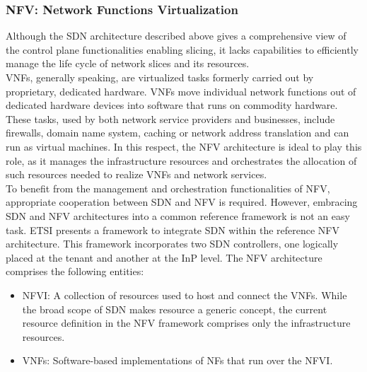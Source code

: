 \documentclass{report}
\begin{document}
\subsubsection{NFV: Network Functions Virtualization}
Although the SDN architecture described above
gives a comprehensive view of the control plane
functionalities enabling slicing, it lacks capabilities
to efficiently manage the life cycle of
network slices and its resources. \\
VNFs, generally speaking, are virtualized tasks formerly carried out by proprietary, dedicated hardware. VNFs move individual network functions out of dedicated hardware devices into software that runs on commodity hardware. These tasks, used by both network service providers and businesses, include firewalls, domain name system, caching or network address translation and can run as virtual machines. In this respect, the NFV architecture is ideal to play
this role, as it manages the infrastructure resources
and orchestrates the allocation of such resources
needed to realize VNFs and network services.\\
To benefit from the management and orchestration functionalities of NFV, appropriate cooperation between SDN and NFV is required.
However, embracing SDN and NFV architectures
into a common reference framework is not an
easy task. ETSI presents a framework
to integrate SDN within the reference NFV architecture. This framework incorporates two SDN
controllers, one logically placed at the tenant and
another at the InP level. The NFV architecture comprises the following
entities:\\
\begin{itemize}
\item \gls{NFVI}: A collection of resources used to
host and connect the VNFs. While the broad scope of SDN makes resource a generic concept,
the current resource definition in the NFV framework comprises only the infrastructure resources.
\end{itemize}
\begin{itemize}
\item VNFs: Software-based implementations of NFs that run over the NFVI.
\end{itemize}
\end{document}
